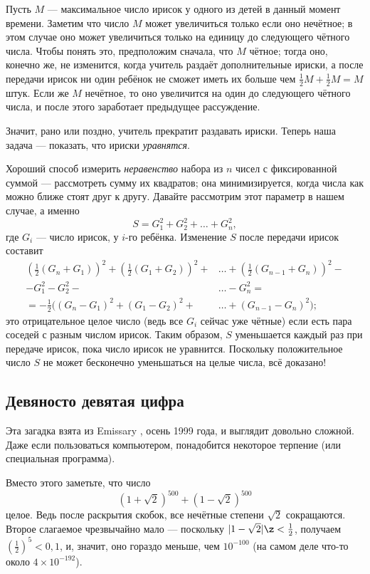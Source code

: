 Пусть $M$ --- максимальное число ирисок у одного из детей в данный момент времени.
Заметим что число $M$ может увеличиться только если оно нечётное;
в этом случае оно может увеличиться только на единицу до следующего чётного числа.
Чтобы понять это, предположим сначала, что $M$ чётное; тогда оно, конечно же, не изменится, когда учитель раздаёт дополнительные ириски, а после передачи ирисок ни один ребёнок не сможет иметь их больше чем $\tfrac12 M + \tfrac12 M = M$ штук.
Если же $M$ нечётное, то оно увеличится на один до следующего чётного числа, и после этого заработает предыдущее рассуждение.

Значит, рано или поздно, учитель прекратит раздавать ириски.
Теперь наша задача --- показать, что ириски \emph{уравнятся}.

Хороший способ измерить \emph{неравенство} набора из $n$ чисел с фиксированной суммой --- рассмотреть сумму их квадратов; она минимизируется, когда числа как можно ближе стоят друг к другу.
Давайте рассмотрим этот параметр в нашем случае, а именно 
\[S = G^2_1 + G^2_2 + \dots + G^2_n,\]
где $G_i$ --- число ирисок, у $i$-го ребёнка.
Изменение $S$ после передачи ирисок составит
\begin{align*}
\left(\tfrac{1}{2}(G_n+G_1)\right)^2+\left(\tfrac{1}{2}(G_1+G_2)\right)^2+&\dots+\left(\tfrac{1}{2}(G_{n-1}+G_n)\right)^2-
\\
-G_1^2-G_2^2-&\dots-G_n^2=
\\
=-\tfrac12\bigl((G_n-G_1)^2+(G_1-G_2)^2+&\dots+(G_{n-1}-G_n)^2\bigr);
\end{align*}
это отрицательное целое число (ведь все $G_i$ сейчас уже чётные) если есть пара соседей с разным числом ирисок.
Таким образом, $S$ уменьшается каждый раз при передаче ирисок, пока число ирисок не уравнится.
Поскольку положительное число $S$ не может бесконечно уменьшаться на целые числа, всё доказано!

\subsection*{Девяносто девятая цифра}

Эта загадка взята из Emissary \cite{berlekamp-buhle}, осень 1999 года, и выглядит довольно сложной.
Даже если пользоваться компьютером, понадобится некоторое терпение (или специальная программа).

Вместо этого заметьте, что число
\[(1+\sqrt{2})^{500}+(1-\sqrt{2})^{500}\]
целое.
Ведь после раскрытия скобок, все нечётные степени $\sqrt{2}$ сокращаются.
Второе слагаемое чрезвычайно мало --- поскольку $|1-\sqrt{2}|\z<\tfrac12$, получаем $(\tfrac12)^5<0{,}1$, и, значит, оно гораздо меньше, чем $10^{-100}$ (на самом деле что-то около $4 \times 10^{-192}$).

